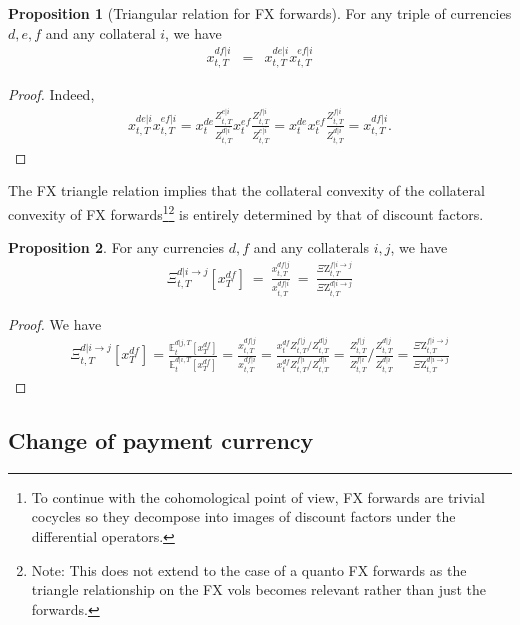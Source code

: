 \documentclass[11pt,english]{amsart}
\newcommand{\EE}{\mathbb{E}}
\newcommand{\Q}{\Xi}
\newcommand{\QZ}{{\Xi\mathrm{Z}}}
\theoremstyle{definition}
\newtheorem{prop}{Proposition}
\begin{document}
\begin{prop}[Triangular relation for FX forwards]
For any triple of currencies $d,e,f$ and any collateral $i$, we have 
\begin{eqnarray}
  x^{df|i}_{t,T} &=& x^{de|i}_{t,T}x^{ef|i}_{t,T}
\end{eqnarray}
\end{prop}

\begin{proof}
Indeed,
\begin{eqnarray}
  x^{de|i}_{t,T}x^{ef|i}_{t,T} 
  =  x^{de}_{t} \frac{Z^{e|i}_{t,T}}{Z^{d|i}_{t,T}} x^{ef}_{t} \frac{Z^{f|i}_{t,T}}{Z^{e|i}_{t,T}} 
  =  x^{de}_{t}x^{ef}_{t} \frac{Z^{f|i}_{t,T}}{Z^{d|i}_{t,T}}   
  =  x^{df|i}_{t,T}.
\end{eqnarray}
\end{proof}


The FX triangle relation implies that the collateral convexity of the collateral convexity of FX forwards\footnote{To continue with the cohomological point of view, FX forwards are trivial cocycles so they decompose into images of discount factors under the differential operators.}\footnote{Note: This does not extend to the case of a quanto FX forwards as the triangle relationship on the FX vols becomes relevant rather than just the forwards.} is entirely determined by that of discount factors. %
\begin{prop}
For any currencies $d,f$ and any collaterals $i,j$, we have 
\begin{eqnarray}
  \Q^{d|i\to j}_{t,T} [ x^{df}_T ] ~=~ \frac{x^{df|j}_{t,T}}{x^{df|i}_{t,T}} ~=~ \frac{\QZ^{f|i\to j}_{t,T}}{\QZ^{d|i\to j}_{t,T}} 
\end{eqnarray}
\end{prop}

\begin{proof}
We have 
\begin{eqnarray}
 \Q^{d|i\to j}_{t,T} [ x^{df}_T ]  
  = \frac{\EE^{d|j,T}_t\left[ x^{df}_T \right] } {\EE^{d|i,T}_t\left[ x^{df}_T \right] }  
  = \frac{x^{df|j}_{t,T}}{x^{df|i}_{t,T}} 
  = \frac{x^{df}_{t}Z^{f|j}_{t,T}/Z^{d|j}_{t,T}}{x^{df}_{t}Z^{f|i}_{t,T}/Z^{d|i}_{t,T}} 
  = \frac{Z^{f|j}_{t,T}}{Z^{f|i}_{t,T}} \Big/ \frac{Z^{d|j}_{t,T}}{Z^{d|i}_{t,T}} 
  =  \frac{\QZ^{f|i\to j}_{t,T}}{\QZ^{d|i\to j}_{t,T}} 
\end{eqnarray}
\end{proof}

\subsection{Change of  payment currency}
\end{document}
